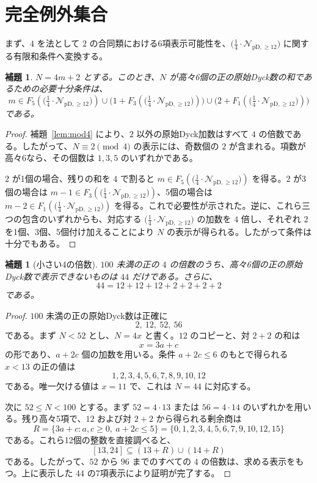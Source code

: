\documentclass[12pt]{ltjsarticle}
\theoremstyle{plain}
\newtheorem{lemma}[theorem]{補題}
\theoremstyle{definition}
\theoremstyle{plain}
\newcommand{\Pset}{%
  \bigl(\tfrac{1}{4}\cdot\mathcal{N}_{\mathrm{pD},\geq 12}\bigr)%
}
\begin{document}
\section{完全例外集合}\label{sec:exceptions}

まず、$4$ を法として $2$ の合同類における6項表示可能性を、$\Pset$ に関する有限和条件へ変換する。

\begin{lemma}\label{lem:sixcriterion}
$N=4m+2$ とする。このとき、$N$ が高々6個の正の原始Dyck数の和であるための必要十分条件は、
\[
 m\in F_5(\Pset)
 \cup\bigl(1+F_3(\Pset)\bigr)
 \cup\bigl(2+F_1(\Pset)\bigr)
\]
である。
\end{lemma}

\begin{proof}
補題~\ref{lem:mod4} により、$2$ 以外の原始Dyck加数はすべて $4$ の倍数である。したがって、$N\equiv2\pmod4$ の表示には、奇数個の $2$ が含まれる。項数が高々6なら、その個数は $1,3,5$ のいずれかである。

$2$ が1個の場合、残りの和を $4$ で割ると $m\in F_5(\Pset)$ を得る。$2$ が3個の場合は $m-1\in F_3(\Pset)$、5個の場合は $m-2\in F_1(\Pset)$ を得る。これで必要性が示された。逆に、これら三つの包含のいずれからも、対応する $\Pset$ の加数を $4$ 倍し、それぞれ $2$ を1個、3個、5個付け加えることにより $N$ の表示が得られる。したがって条件は十分でもある。
\end{proof}

\begin{lemma}[小さい4の倍数]\label{lem:smallmultiples}
$100$ 未満の正の $4$ の倍数のうち、高々6個の正の原始Dyck数で表示できないものは $44$ だけである。さらに、
\[
 44=12+12+12+2+2+2+2
\]
である。
\end{lemma}

\begin{proof}
$100$ 未満の正の原始Dyck数は正確に
\[
 2,\ 12,\ 52,\ 56
\]
である。まず $N<52$ とし、$N=4x$ と書く。$12$ のコピーと、対 $2+2$ の和は
\[
 x=3a+c
\]
の形であり、$a+2c$ 個の加数を用いる。条件 $a+2c\leq6$ のもとで得られる $x<13$ の正の値は
\[
 1,2,3,4,5,6,7,8,9,10,12
\]
である。唯一欠ける値は $x=11$ で、これは $N=44$ に対応する。

次に $52\leq N<100$ とする。まず $52=4\cdot13$ または $56=4\cdot14$ のいずれかを用いる。残り高々5項で、$12$ および対 $2+2$ から得られる剰余商は
\[
 R=\{3a+c:a,c\geq0,\ a+2c\leq5\}
   =\{0,1,2,3,4,5,6,7,9,10,12,15\}
\]
である。これら12個の整数を直接調べると、
\[
 [13,24]\subseteq(13+R)\cup(14+R)
\]
である。したがって、$52$ から $96$ までのすべての $4$ の倍数は、求める表示をもつ。上に表示した $44$ の7項表示により証明が完了する。
\end{proof}
\end{document}
